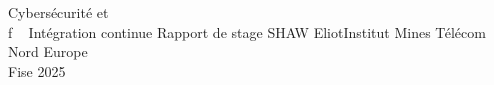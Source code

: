 \documentclass[a4paper,12pt]{report}
\begin{document}
\imtnepagedegarde
    {Cybersécurité et\\\hphantom f \qquad ~ Intégration continue} %
    {Rapport de stage} %
    {SHAW Eliot\vspace{5px}Institut Mines Télécom Nord Europe\\Fise 2025} %

\cleardoublepage


\clearpage

\tableofcontents
\clearpage














\cleardoublepage


\end{document}
